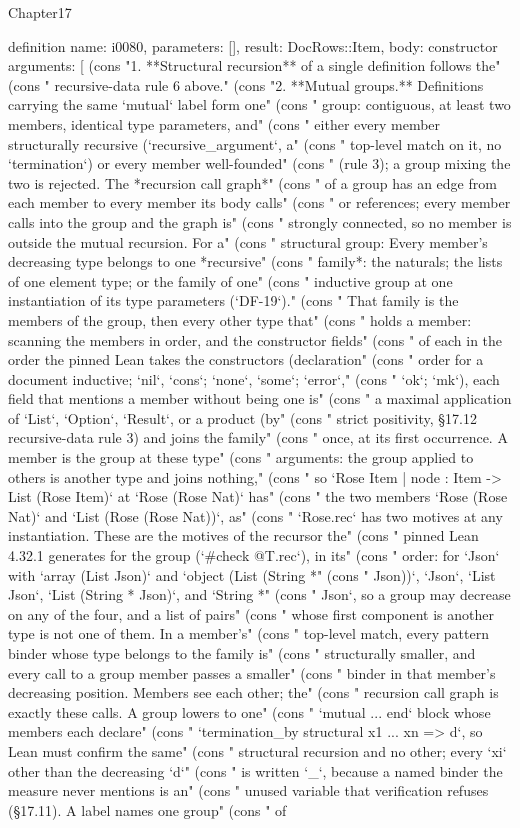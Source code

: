 \begin{lexlean}{Chapter17}
\begin{semanticmodule}
definition{
  name: i0080,
  parameters: [],
  result: DocRows::Item,
  body: constructor{
    arguments: [
      (cons "1. **Structural recursion** of a single definition follows the" (cons "   recursive-data rule 6 above." (cons "2. **Mutual groups.** Definitions carrying the same `mutual` label form one" (cons "   group: contiguous, at least two members, identical type parameters, and" (cons "   either every member structurally recursive (`recursive_argument`, a" (cons "   top-level match on it, no `termination`) or every member well-founded" (cons "   (rule 3); a group mixing the two is rejected. The *recursion call graph*" (cons "   of a group has an edge from each member to every member its body calls" (cons "   or references; every member calls into the group and the graph is" (cons "   strongly connected, so no member is outside the mutual recursion. For a" (cons "   structural group: Every member's decreasing type belongs to one *recursive" (cons "   family*: the naturals; the lists of one element type; or the family of one" (cons "   inductive group at one instantiation of its type parameters (`DF-19`)." (cons "   That family is the members of the group, then every other type that" (cons "   holds a member: scanning the members in order, and the constructor fields" (cons "   of each in the order the pinned Lean takes the constructors (declaration" (cons "   order for a document inductive; `nil`, `cons`; `none`, `some`; `error`," (cons "   `ok`; `mk`), each field that mentions a member without being one is" (cons "   a maximal application of `List`, `Option`, `Result`, or a product (by" (cons "   strict positivity, §17.12 recursive-data rule 3) and joins the family" (cons "   once, at its first occurrence. A member is the group at these type" (cons "   arguments: the group applied to others is another type and joins nothing," (cons "   so `Rose Item | node : Item -> List (Rose Item)` at `Rose (Rose Nat)` has" (cons "   the two members `Rose (Rose Nat)` and `List (Rose (Rose Nat))`, as" (cons "   `Rose.rec` has two motives at any instantiation. These are the motives of the recursor the" (cons "   pinned Lean 4.32.1 generates for the group (`#check @T.rec`), in its" (cons "   order: for `Json` with `array (List Json)` and `object (List (String *" (cons "   Json))`, `Json`, `List Json`, `List (String * Json)`, and `String *" (cons "   Json`, so a group may decrease on any of the four, and a list of pairs" (cons "   whose first component is another type is not one of them. In a member's" (cons "   top-level match, every pattern binder whose type belongs to the family is" (cons "   structurally smaller, and every call to a group member passes a smaller" (cons "   binder in that member's decreasing position. Members see each other; the" (cons "   recursion call graph is exactly these calls. A group lowers to one" (cons "   `mutual ... end` block whose members each declare" (cons "   `termination_by structural x1 ... xn => d`, so Lean must confirm the same" (cons "   structural recursion and no other; every `xi` other than the decreasing `d`" (cons "   is written `_`, because a named binder the measure never mentions is an" (cons "   unused variable that verification refuses (§17.11). A label names one group" (cons "   of }}
\end{semanticmodule}
\end{lexlean}
